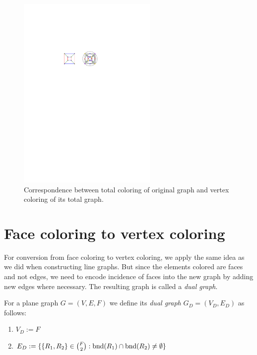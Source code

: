 \begin{figure}[H]
    \centering
    \includegraphics[width=0.6\textwidth]{../Resources/Figs/cubical_tot_g_clring.pdf}
    \caption{Correspondence between total coloring of original graph and vertex coloring of its total graph.}
    \label{fig:cubical_tot_g_clring}
\end{figure}

\section{Face coloring to vertex coloring}

For conversion from face coloring to vertex coloring, we apply the same idea as we did when constructing line graphs. But since the elements colored are faces and not edges, we need to encode incidence of faces into the new graph by adding new edges where necessary. The resulting graph is called a \textit{dual graph}.

\begin{definition}
    For a plane graph $G=(V,E,F)$ we define its \textit{dual graph} $G_D=(V_D,E_D)$ as follows:
    \begin{enumerate}
        \item $V_D := F$
        \item $E_D := \{ \{R_1,R_2\} \in \binom{F}{2}: \operatorname{bnd}(R_1) \cap \operatorname{bnd}(R_2) \neq \emptyset \}$
    \end{enumerate}
\end{definition}

